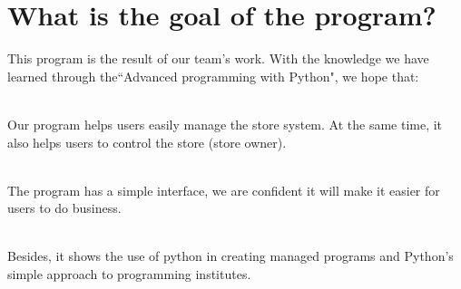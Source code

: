 \vspace{3cm}
\section{What is the goal of the  program?}

\hspace{0.7cm}This program is the result of our team's work. With the knowledge we have learned through the“Advanced programming with Python", we hope that:

\vspace{0.35cm}
\\Our program helps users easily manage the store system. At the same time, it also helps users to control the store (store owner). 

\\The program has a simple interface, we are confident it will make it easier for users to do business.

\\Besides, it shows the use of python in creating managed programs and Python's simple approach to programming institutes.